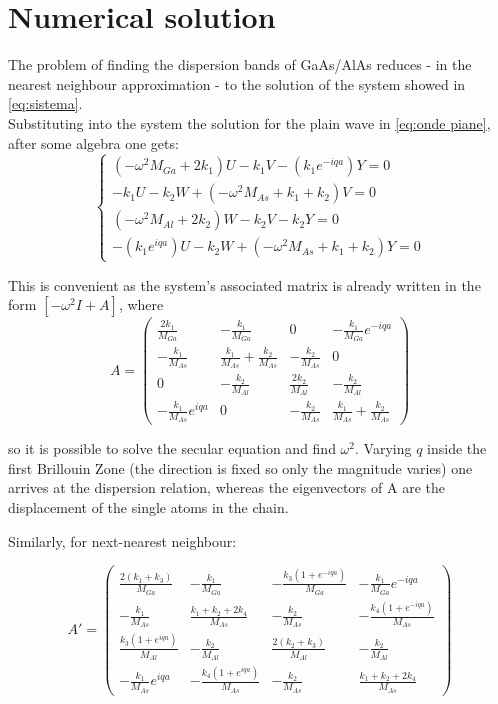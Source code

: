 \documentclass{article}
\begin{document}
\section{Numerical solution}
The problem of finding the dispersion bands of GaAs/AlAs reduces - in the nearest neighbour approximation - to the solution of the system showed in \autoref{eq:sistema}. \\
Substituting into the system the solution for the plain wave in \autoref{eq:onde piane}, after some algebra one gets:
\begin{equation}
	\begin{cases}
		(-\omega^2M_{Ga} + 2k_1)U - k_1V - (k_1e^{-iqa})Y = 0 \\
		-k_1U -k_2W + (-\omega^2M_{As} + k_1 + k_2)V = 0 \\
		(-\omega^2M_{Al} + 2k_2)W -k_2V - k_2Y = 0 \\
		-(k_1e^{iqa})U - k_2W + (-\omega^2M_{As} + k_1 + k_2)Y = 0	
	\end{cases}
	\label{sist.final}
\end {equation}

This is convenient as the system's associated matrix is already written in the form $[-\omega^2I + A]$, where
\begin{equation} 
A = \begin{pmatrix}
   \frac{2k_1}{M_{Ga}}				& -\frac{k_1}{M_{Ga}}  			 & 0  			 & -\frac{k_1}{M_{Ga}}e^{-iqa}  \\ 
   -\frac{k_1}{M_{As}} 				& \frac{k_1}{M_{As}}+\frac{k_2}{M_{As}}  & -\frac{k_2}{M_{As}}    & 0  \\ 
   0						& -\frac{k_2}{M_{Al}}  			 & \frac{2k_2}{M_{Al}} 	 & -\frac{k_2}{M_{Al}}  \\ 
   -\frac{k_1}{M_{As}}e^{iqa} 			& 0 					 & -\frac{k_2}{M_{As}}    & \frac{k_1}{M_{As}}+\frac{k_2}{M_{As}}   
\end{pmatrix} 
\label{eq:matrice}
\end{equation}


so it is possible to solve the secular equation and find $\omega^2$. Varying $q$ inside the first Brillouin Zone (the direction is fixed so only the magnitude varies) one arrives at the dispersion relation, whereas the eigenvectors of A are the displacement of the single atoms in the chain.\par
Similarly, for next-nearest neighbour:

\begin{equation} 
A' = \begin{pmatrix}
	\frac{2(k_1+k_3)}{M_{Ga}}				& -\frac{k_1}{M_{Ga}}  			 & -\frac{k_3(1+e^{-iqa})}{M_{Ga}} & -\frac{k_1}{M_{Ga}}e^{-iqa}  \\ 
		-\frac{k_1}{M_{As}} 						& \frac{k_1+k_2+2k_4}{M_{As}} 				 & -\frac{k_2}{M_{As}}             & -\frac{k_4(1+e^{-iqa})}{M_{As}}\\ 
		\frac{k_3(1+e^{iqa})}{M_{Al}}				& -\frac{k_2}{M_{Al}}  		 	& \frac{2(k_2+k_3)}{M_{Al}} 	 & -\frac{k_2}{M_{Al}}  \\ 
	 -\frac{k_1}{M_{As}}e^{iqa} 			& -\frac{k_4(1+e^{iqa})}{M_{As}} 					 & -\frac{k_2}{M_{As}}    & \frac{k_1+k_2+2k_4}{M_{As}}   
\end{pmatrix} 
\label{eq:matrice}
\end{equation}
\end{document}
